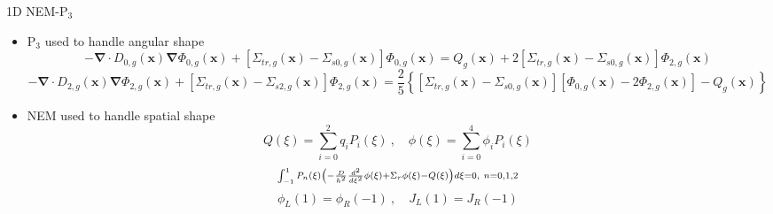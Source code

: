 \begin{frame}[t]{1D NEM-P$_3$}
    
        \begin{itemize}
          \item P$_3$ \cite{SPnEquations} used to handle angular shape 
          \begin{dmath*}\scriptstyle
            {-\bm{\nabla} \cdot D_{0,g} \left(\bm x\right) \bm \nabla 
            \Phi_{0,g}\left(\bm x\right) + \left[\Sigma_{tr,g}\left(\bm 
            x\right) - \Sigma_{s0,g}\left(\bm 
            x\right)\right]\Phi_{0,g}\left(\bm x\right)} = {Q_g\left(\bm 
            x\right) + 2\left[\Sigma_{tr,g}\left(\bm x\right) - 
            \Sigma_{s0,g}\left(\bm x\right)\right]\Phi_{2,g}\left(\bm 
            x\right)}
          \end{dmath*}
          \begin{dmath*}\scriptstyle
            {-\bm{\nabla} \cdot D_{2,g} \left(\bm x\right) \bm \nabla 
            \Phi_{2,g}\left(\bm x\right) + \left[\Sigma_{tr,g}\left(\bm 
            x\right) - \Sigma_{s2,g}\left(\bm 
            x\right)\right]\Phi_{2,g}\left(\bm x\right)} = 
            {\frac{2}{5}\left\lbrace \left[\Sigma_{tr,g}\left(\bm x\right) - 
            \Sigma_{s0,g}\left(\bm x\right)\right]\left[\Phi_{0,g}\left(\bm 
            x\right) - 2\Phi_{2,g}\left(\bm x\right)\right] - Q_g\left(\bm 
            x\right) \right\rbrace}
          \end{dmath*}
          \item NEM \cite{finnemann1977RodCuspingOrigMention} used to handle spatial shape
          \begin{equation*}\scriptstyle
          Q\left(\xi\right) = \sum_{i=0}^2 q_i P_i\left(\xi\right)\ , \quad 
          \phi\left(\xi\right) = \sum_{i=0}^4 \phi_i P_i\left(\xi\right)
          \end{equation*}
          \begin{equation*}\scriptstyle
          \intop_{-1}^1 P_n\left(\xi\right) 
          \left(-\frac{D}{h^2}\frac{d^2}{d\xi^2}\phi\left(\xi\right) + \Sigma_r 
          \phi\left(\xi\right) - Q\left(\xi\right)\right)d\xi = 0,\ n=0,1,2
          \end{equation*}
          \begin{equation*}\scriptstyle
          \phi_L\left(1\right) = \phi_R\left(-1\right)\ , \quad 
          J_L\left(1\right) = J_R\left(-1\right)
          \end{equation*}
        \end{itemize}
    
\end{frame}

